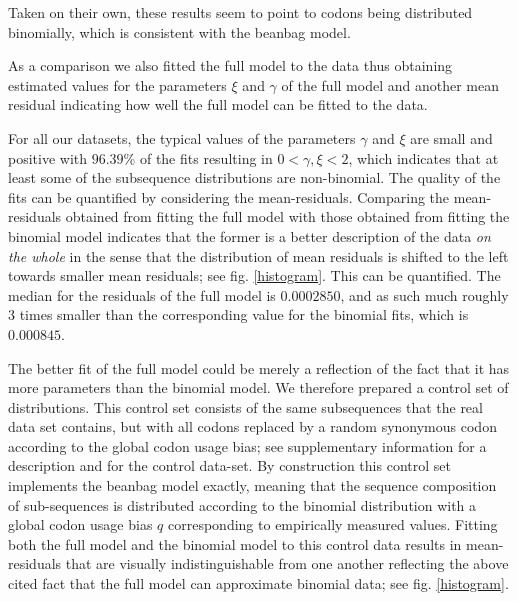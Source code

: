 \documentclass[a4paper,10pt]{paper}%
\begin{document}
Taken on their own, these results seem to point to codons being distributed binomially, which is consistent with the beanbag model.
\par
As a comparison we  also  fitted the full model to the data  thus obtaining   estimated values for  the parameters $\xi$ and $\gamma$ of the full model and another mean residual indicating how well the full model can be fitted to the data.
\par
\par
%
%
%
For all our datasets, the typical values of the parameters $\gamma$ and $\xi$ are small and  positive  with  $96.39$\% of the fits resulting  in  $0<\gamma,\xi<2$, which indicates that at least some of the subsequence distributions are non-binomial.  The quality of the fits can be quantified by considering the mean-residuals.  Comparing the mean-residuals obtained from  fitting the  full model with those obtained from fitting the binomial model  indicates that the former is a better description of the data {\em on the whole} in the sense that the distribution of mean residuals is  shifted to the left towards smaller mean residuals; see fig. \ref{histogram}. This can be quantified. The median for the  residuals of the full model is  $0.0002850$, and as such much roughly 3 times smaller than the corresponding value for the binomial fits, which is $0.000845$.  
\par
The   better fit of the full model could be  merely a reflection of the fact that it has  more  parameters than the  binomial model. We therefore   prepared a control set of  distributions. This control set consists of the same subsequences that the real data set contains, but with all codons replaced by a random synonymous codon according to the global codon usage bias; see supplementary information for a description and for the control data-set. By construction this control set implements the beanbag model exactly, meaning  that the  sequence composition of sub-sequences is distributed according to the binomial distribution  with a global  codon usage bias $q$ corresponding to empirically measured values.   Fitting both the full model and the binomial model to this control data results in mean-residuals that are  visually indistinguishable from one another reflecting the above cited fact that the full model can approximate binomial data; see  fig. \ref{histogram}.  
\end{document}
